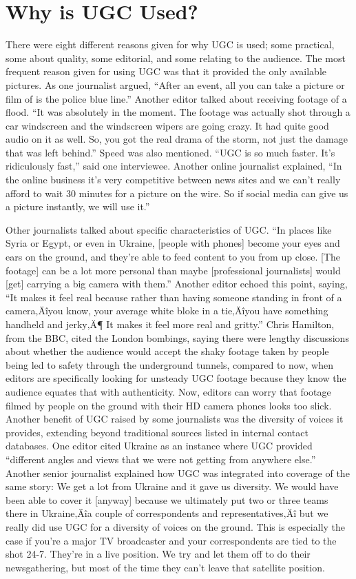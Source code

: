 \documentclass[symmetric, notoc, nobib]{towcenter-book}
\begin{document}
\section{Why is UGC Used?}
There were eight different reasons given for why UGC is used; some practical,
some about quality, some editorial, and some relating to the audience.
The most frequent reason given for using UGC was that it provided the
only available pictures. As one journalist argued, ``After an event, all you can
take a picture or film of is the police blue line.'' Another editor talked about
receiving footage of a flood. ``It was absolutely in the moment. The footage
was actually shot through a car windscreen and the windscreen wipers are
going crazy. It had quite good audio on it as well. So, you got the real drama
of the storm, not just the damage that was left behind.''
Speed was also mentioned. ``UGC is so much faster. It's ridiculously fast,''
said one interviewee. Another online journalist explained, ``In the online
business it's very competitive between news sites and we can't really afford
to wait 30 minutes for a picture on the wire. So if social media can give us a
picture instantly, we will use it.''

Other journalists talked about specific characteristics of UGC. ``In places
like Syria or Egypt, or even in Ukraine, [people with phones] become your
eyes and ears on the ground, and they're able to feed content to you from
up close. [The footage] can be a lot more personal than maybe [professional
journalists] would [get] carrying a big camera with them.'' Another editor
echoed this point, saying, ``It makes it feel real because rather than having
someone standing in front of a camera‚Äîyou know, your average white bloke
in a tie‚Äîyou have something handheld and jerky‚Ä¶ It makes it feel more
real and gritty.'' Chris Hamilton, from the BBC, cited the London bombings,
saying there were lengthy discussions about whether the audience would
accept the shaky footage taken by people being led to safety through the
underground tunnels, compared to now, when editors are specifically looking
for unsteady UGC footage because they know the audience equates that
with authenticity. Now, editors can worry that footage filmed by people on
the ground with their HD camera phones looks too slick.
Another benefit of UGC raised by some journalists was the diversity of
voices it provides, extending beyond traditional sources listed in internal
contact databases. One editor cited Ukraine as an instance where UGC provided
``different angles and views that we were not getting from anywhere
else.'' Another senior journalist explained how UGC was integrated into
coverage of the same story:
We get a lot from Ukraine and it gave us diversity. We would have
been able to cover it [anyway] because we ultimately put two or three
teams there in Ukraine‚Äîa couple of correspondents and representatives‚Äî
but we really did use UGC for a diversity of voices on the
ground. This is especially the case if you're a major TV broadcaster
and your correspondents are tied to the shot 24-7. They're in a live
position. We try and let them off to do their newsgathering, but most
of the time they can't leave that satellite position.
\end{document}
